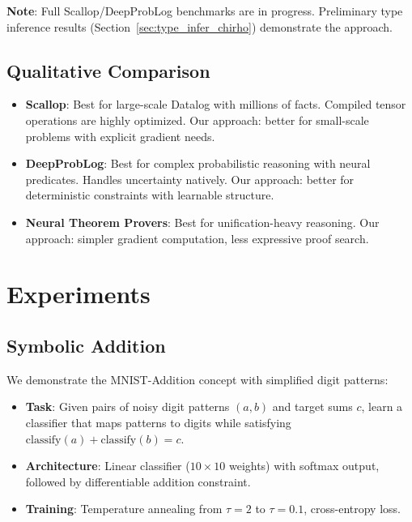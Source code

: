 \documentclass[11pt,a4paper]{article}
\begin{document}
\textbf{Note}: Full Scallop/DeepProbLog benchmarks are in progress.
Preliminary type inference results (Section~\ref{sec:type_infer_chirho}) demonstrate the approach.

\subsection{Qualitative Comparison}
\label{subsec:qualitative_chirho}

\begin{itemize}
  \item \textbf{Scallop}: Best for large-scale Datalog with millions of facts.
  Compiled tensor operations are highly optimized.
  Our approach: better for small-scale problems with explicit gradient needs.

  \item \textbf{DeepProbLog}: Best for complex probabilistic reasoning with neural predicates.
  Handles uncertainty natively.
  Our approach: better for deterministic constraints with learnable structure.

  \item \textbf{Neural Theorem Provers}: Best for unification-heavy reasoning.
  Our approach: simpler gradient computation, less expressive proof search.
\end{itemize}

\section{Experiments}
\label{sec:experiments_chirho}

\subsection{Symbolic Addition}
\label{subsec:symbolic_addition_chirho}

We demonstrate the MNIST-Addition concept with simplified digit patterns:
\begin{itemize}
  \item \textbf{Task}: Given pairs of noisy digit patterns $(a, b)$ and target sums $c$, learn a classifier that maps patterns to digits while satisfying $\text{classify}(a) + \text{classify}(b) = c$.
  \item \textbf{Architecture}: Linear classifier ($10 \times 10$ weights) with softmax output, followed by differentiable addition constraint.
  \item \textbf{Training}: Temperature annealing from $\tau = 2$ to $\tau = 0.1$, cross-entropy loss.
\end{itemize}
\end{document}
